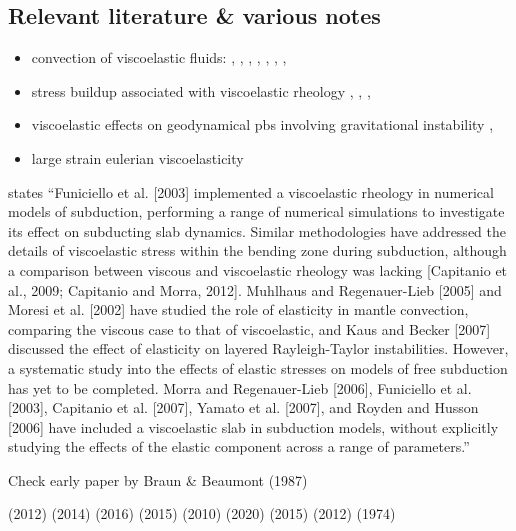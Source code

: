 \subsection{Relevant literature \& various notes}



\begin{itemize}
\item convection of viscoelastic fluids: 
\textcite{hard91}, \textcite{momy93}, 
\textcite{zhgm96}, \textcite{modm02}, 
\textcite{mure05}, \textcite{likh05a},  
\textcite{likh05b}, \textcite{fukk08}


\item stress buildup associated with viscoelastic rheology 
\textcite{kubo77}, \textcite{kupa84}, \textcite{pocp93}, \textcite{mapo09}

\item viscoelastic effects on geodynamical pbs involving gravitational instability 
\textcite{pocp93,kabe07,bumo08,scbe08}, 
\textcite{hamy95} 

\item large strain  eulerian viscoelasticity 
\textcite{scps01,vapy01,coll06,moql07,fukk08,poso08}

\end{itemize}

\textcite{famc14} states 
``Funiciello et al. [2003] implemented a viscoelastic rheology in numerical models of subduction, performing a
range of numerical simulations to investigate its effect on subducting slab dynamics. Similar methodologies have addressed the details of viscoelastic stress within the bending zone during subduction, although a comparison between viscous and viscoelastic rheology was lacking [Capitanio et al., 2009; Capitanio and Morra, 2012].
Muhlhaus and Regenauer-Lieb [2005] and Moresi et al. [2002] have studied the role of elasticity in mantle convection, comparing the viscous case to that of viscoelastic, and Kaus and Becker [2007] discussed the effect of elasticity on layered Rayleigh-Taylor instabilities. However, a systematic study into the effects of elastic stresses on models of free subduction has yet to be completed. Morra and Regenauer-Lieb [2006], Funiciello et al. [2003], Capitanio et al. [2007], Yamato et al. [2007], and Royden and Husson [2006] have included a viscoelastic slab in subduction models, without explicitly studying the effects of the elastic component across a range of parameters.''


Check early paper by Braun \& Beaumont (1987) \cite{brbe87}

\textcite{asmo12} (2012)
\textcite{hepk14} (2014)
\textcite{daws16} (2016)
\textcite{thkp15} (2015)
\textcite{beps10} (2010)
\textcite{samb20} (2020)
\textcite{vosc15} (2015)
\textcite{nalr12} (2012)
\textcite{pelt74} (1974)
